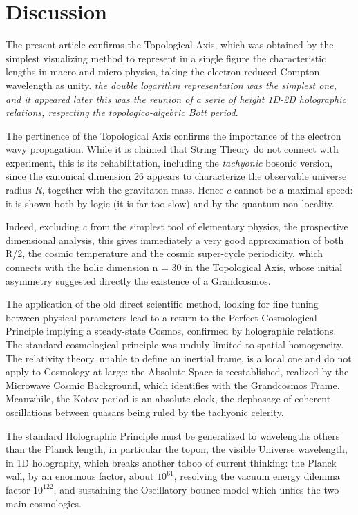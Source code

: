 \documentclass[twoside,draft]{article}
\begin{document}
\begin{sloppypar}
\section {Discussion}

The present article confirms the Topological Axis, which was obtained by the simplest visualizing method to represent in a single figure the characteristic lengths in macro and micro-physics, taking the electron reduced Compton wavelength as unity. \textit {the double logarithm representation was the simplest one, and it appeared later this was the reunion of a serie of height 1D-2D holographic relations, respecting the topologico-algebric Bott period}.

The pertinence of the Topological Axis confirms the importance of the electron wavy propagation. While it is claimed that String Theory do not connect with experiment, this is its rehabilitation, including the \textit{tachyonic} bosonic version, since the canonical dimension 26 appears to characterize the observable universe radius $R$, together with the gravitaton mass. Hence $c$ cannot be a maximal speed: it is shown both by logic (it is far too slow) and by the quantum non-locality.

Indeed, excluding $c$ from the simplest tool of elementary physics, the prospective dimensional analysis, this gives immediately a very good approximation of both R/2, the cosmic temperature and the cosmic super-cycle periodicity, which connects with the holic dimension n = 30 in the Topological Axis, whose initial asymmetry suggested directly the existence of a Grandcosmos.

The application of the old direct scientific method, looking for fine tuning between physical parameters lead to a return to the Perfect Cosmological Principle implying a steady-state Cosmos, confirmed by holographic relations. The standard cosmological principle was unduly limited to spatial homogeneity. The relativity theory, unable to define an inertial frame, is a local one and do
not apply to Cosmology at large: the Absolute Space is reestablished, realized by the Microwave Cosmic Background, which identifies with the Grandcosmos Frame. Meanwhile, the Kotov period is an absolute clock, the dephasage of coherent oscillations between quasars being ruled by the tachyonic celerity.

The standard Holographic Principle must be generalized to wavelengths others than the Planck
length, in particular the topon, the visible Universe wavelength, in 1D holography, which breaks
another taboo of current thinking: the Planck wall, by an enormous factor, about $10^{61}$, resolving the
vacuum energy dilemma factor $10^{122}$, and sustaining the Oscillatory bounce model which unfies the two main cosmologies.


\end{sloppypar}
\end{document}
